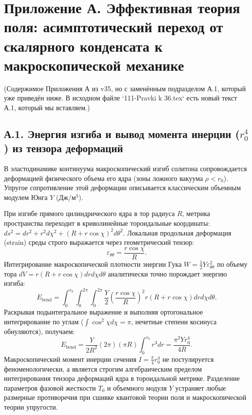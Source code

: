\documentclass[11pt,a4paper]{article}
\begin{document}
	\section*{Приложение А. Эффективная теория поля: асимптотический переход от скалярного конденсата к макроскопической механике}
	
	(Содержимое Приложения А из v35, но с заменённым подразделом А.1, который уже приведён ниже. В исходном файле `111-Pravki k 36.tex` есть новый текст А.1, который мы вставляем.)
	
	\subsection*{А.1. Энергия изгиба и вывод момента инерции ($r_0^4$) из тензора деформаций}
	В эластодинамике континуума макроскопический изгиб солитона сопровождается деформацией физического объема его ядра (зоны ложного вакуума $\rho < r_0$). Упругое сопротивление этой деформации описывается классическим объемным модулем Юнга $Y$ (Дж/м$^3$).
	
	При изгибе прямого цилиндрического ядра в тор радиуса $R$, метрика пространства переходит в криволинейные тороидальные координаты: $ds^2 = dr^2 + r^2 d\chi^2 + (R + r\cos\chi)^2 d\theta^2$.
	Локальная продольная деформация (strain) среды строго выражается через геометрический тензор:
	\begin{equation}
		\varepsilon_{\theta\theta} = \frac{r \cos\chi}{R}.
	\end{equation}
	Интегрирование макроскопической плотности энергии Гука $W = \frac{1}{2} Y \varepsilon_{\theta\theta}^2$ по объему тора $dV = r(R + r\cos\chi) dr d\chi d\theta$ аналитически точно порождает энергию изгиба:
	\begin{equation}
		E_{\text{bend}} = \int_0^{r_0} \int_0^{2\pi} \int_0^{2\pi} \frac{Y}{2} \left( \frac{r \cos\chi}{R} \right)^2 r(R + r\cos\chi) dr d\chi d\theta.
	\end{equation}
	Раскрывая подынтегральное выражение и выполняя ортогональное интегрирование по углам ($\int \cos^2\chi d\chi = \pi$, нечетные степени косинуса обнуляются), получаем:
	\begin{equation}
		E_{\text{bend}} = \frac{Y}{2 R^2} (2\pi) (\pi R) \int_0^{r_0} r^3 dr = \frac{\pi^2 Y r_0^4}{4 R}.
	\end{equation}
	Макроскопический момент инерции сечения $I = \frac{\pi}{4} r_0^4$ не постулируется феноменологически, а является строгим алгебраическим пределом интегрирования тензора деформаций ядра в тороидальной метрике. Разделение параметров фазовой жесткости $T_0$ и объемного модуля $Y$ устраняет любые размерные противоречия при сшивке квантовой теории поля и макроскопической теории упругости.
	
\end{document}
